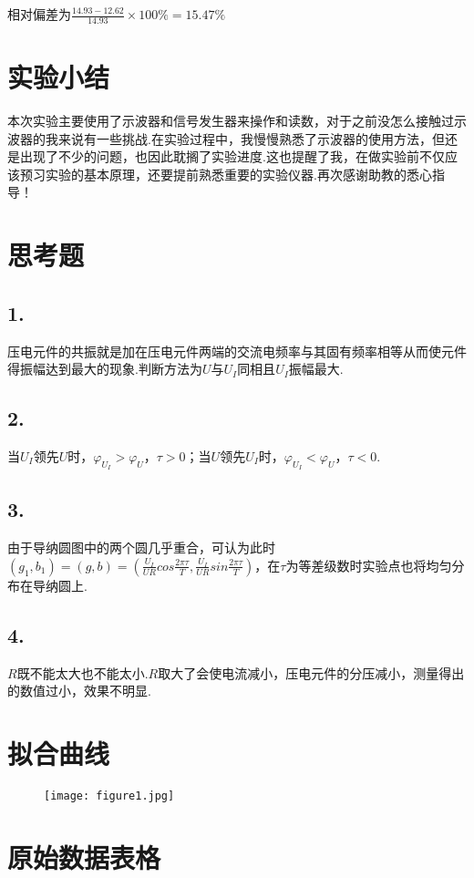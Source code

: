 \documentclass{thureport}
\begin{document}
相对偏差为$\frac{14.93-12.62}{14.93}\times100\%=15.47\%$
\section{实验小结}
本次实验主要使用了示波器和信号发生器来操作和读数，对于之前没怎么接触过示波器的我来说有一些挑战.在实验过程中，我慢慢熟悉了示波器的使用方法，但还是出现了不少的问题，也因此耽搁了实验进度.这也提醒了我，在做实验前不仅应该预习实验的基本原理，还要提前熟悉重要的实验仪器.再次感谢助教的悉心指导！

\section{思考题}
\subsection*{1.}
压电元件的共振就是加在压电元件两端的交流电频率与其固有频率相等从而使元件得振幅达到最大的现象.判断方法为$U$与$U_I$同相且$U_I$振幅最大.

\subsection*{2.}
当$U_I$领先$U$时，$\varphi_{U_I}>\varphi_{U}$，$\tau>0$；当$U$领先$U_I$时，$\varphi_{U_I}<\varphi_{U}$，$\tau<0$.

\subsection*{3.}
由于导纳圆图中的两个圆几乎重合，可认为此时$(g_1,b_1)=(g,b)=(\frac{U_I}{UR}cos\frac{2\pi\tau}{T},\frac{U_I}{UR}sin\frac{2\pi\tau}{T})$，在$\tau$为等差级数时实验点也将均匀分布在导纳圆上.

\subsection*{4.}
$R$既不能太大也不能太小.$R$取大了会使电流减小，压电元件的分压减小，测量得出的数值过小，效果不明显.

\clearpage
\section{拟合曲线}
\begin{figure}[h]
	\centering
	\texttt{[image: figure1.jpg]}
\end{figure}

\clearpage
\section{原始数据表格}
\clearpage
\end{document}

